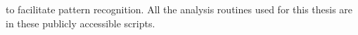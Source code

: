 																																																																																																																																																																																																																																																																																																																																																																																																																																																								to facilitate pattern recognition.
																																																																																																																																																																																																																																																																																																																																																																																																																																																								All the analysis routines used for this thesis are in these publicly accessible scripts.

